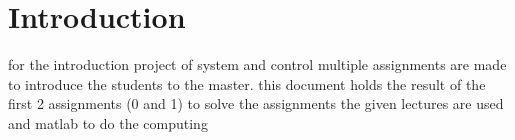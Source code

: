 \chapter{Introduction}
for the introduction project of system and control multiple assignments are made to introduce the students to the master.
this document holds the result of the first 2 assignments (0 and 1)
to solve the assignments the given lectures are used and matlab to do the computing